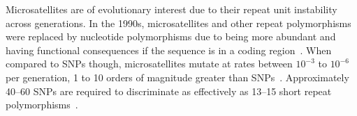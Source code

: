 Microsatellites are of evolutionary interest due to their repeat unit instability across generations.
In the 1990s, microsatellites and other repeat polymorphisms were replaced by nucleotide polymorphisms due to being
more abundant and having functional consequences if the sequence is in a coding
region~\cite{graySingleNucleotidePolymorphisms2000}.
When compared to SNPs though, microsatellites mutate at rates between $10^{-3}$ to $10^{-6}$ per generation,
1 to 10 orders of magnitude greater than SNPs~\cite{gemayelJunkVariableTandemRepeats2012}.
Approximately 40--60 SNPs are required to discriminate as effectively as 13--15 short repeat
polymorphisms~\cite{butlerSTRsVsSNPs2007}.
